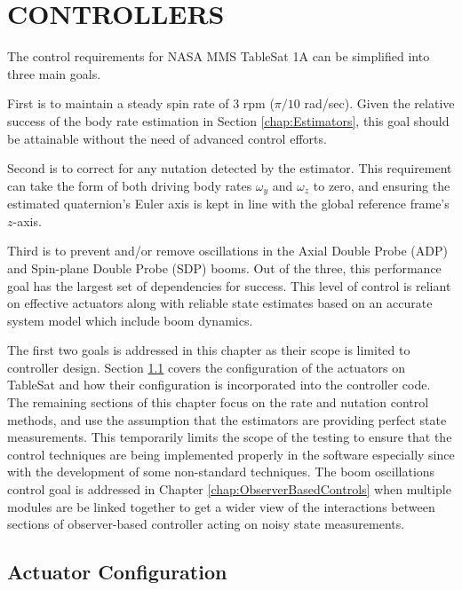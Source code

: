 
\chapter{CONTROLLERS}
\label{chap:Controllers}

The control requirements for NASA MMS TableSat 1A can be simplified into three main goals.

First is to maintain a steady spin rate of 3 rpm ($\pi/10$ rad/sec).  Given the relative success of the body rate estimation in Section \ref{chap:Estimators}, this goal should be attainable without the need of advanced control efforts.

Second is to correct for any nutation detected by the estimator.  This requirement can take the form of both driving body rates $\omega_y$ and $\omega_z$ to zero, and ensuring the estimated quaternion's Euler axis is kept in line with the global reference frame's $z$-axis.

Third is to prevent and/or remove oscillations in the Axial Double Probe (ADP) and Spin-plane Double Probe (SDP) booms.  Out of the three, this performance goal has the largest set of dependencies for success.  This level of control is reliant on effective actuators along with reliable state estimates based on an accurate system model which include boom dynamics.

The first two goals is addressed in this chapter as their scope is limited to controller design.  Section \ref{sec:ActuatorConfiguration} covers the configuration of the actuators on TableSat and how their configuration is incorporated into the controller code.  The remaining sections of this chapter focus on the rate and nutation control methods, and use the assumption that the estimators are providing perfect state measurements.  This temporarily limits the scope of the testing to ensure that the control techniques are being implemented properly in the software especially since with the development of some non-standard techniques.  The boom oscillations control goal is addressed in Chapter \ref{chap:ObserverBasedControls} when multiple modules are be linked together to get a wider view of the interactions between sections of observer-based controller acting on noisy state measurements.

\section{Actuator Configuration}
\label{sec:ActuatorConfiguration}

